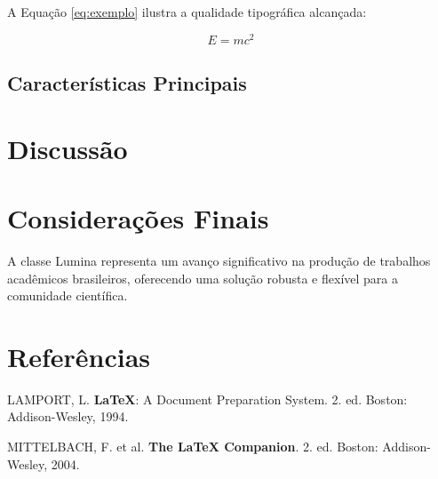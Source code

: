 \documentclass[
    fonte=Arial,           %
    layout=article,        %
    nbr6024=2012          %
]{lumina}
\begin{document}
\lipsum[4]

A Equação \ref{eq:exemplo} ilustra a qualidade tipográfica alcançada:

\begin{equation}
E = mc^2
\label{eq:exemplo}
\end{equation}

\subsection{Características Principais}

\lipsum[5-6]

\section{Discussão}

\lipsum[7-8]

\section{Considerações Finais}

A classe Lumina representa um avanço significativo na produção de trabalhos acadêmicos brasileiros, oferecendo uma solução robusta e flexível para a comunidade científica.

\section*{Referências}

LAMPORT, L. \textbf{LaTeX}: A Document Preparation System. 2. ed. Boston: Addison-Wesley, 1994.

MITTELBACH, F. et al. \textbf{The LaTeX Companion}. 2. ed. Boston: Addison-Wesley, 2004.
\end{document}
